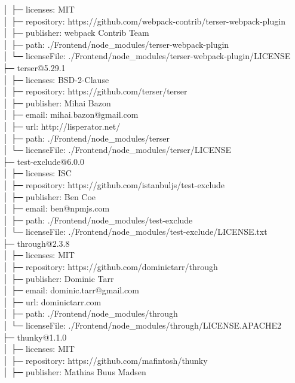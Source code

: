 │  ├─ licenses: MIT\\
│  ├─ repository: https://github.com/webpack-contrib/terser-webpack-plugin\\
│  ├─ publisher: webpack Contrib Team\\
│  ├─ path: ./Frontend/node\_modules/terser-webpack-plugin\\
│  └─ licenseFile: ./Frontend/node\_modules/terser-webpack-plugin/LICENSE\\
├─ terser@5.29.1\\
│  ├─ licenses: BSD-2-Clause\\
│  ├─ repository: https://github.com/terser/terser\\
│  ├─ publisher: Mihai Bazon\\
│  ├─ email: mihai.bazon@gmail.com\\
│  ├─ url: http://lisperator.net/\\
│  ├─ path: ./Frontend/node\_modules/terser\\
│  └─ licenseFile: ./Frontend/node\_modules/terser/LICENSE\\
├─ test-exclude@6.0.0\\
│  ├─ licenses: ISC\\
│  ├─ repository: https://github.com/istanbuljs/test-exclude\\
│  ├─ publisher: Ben Coe\\
│  ├─ email: ben@npmjs.com\\
│  ├─ path: ./Frontend/node\_modules/test-exclude\\
│  └─ licenseFile: ./Frontend/node\_modules/test-exclude/LICENSE.txt\\
├─ through@2.3.8\\
│  ├─ licenses: MIT\\
│  ├─ repository: https://github.com/dominictarr/through\\
│  ├─ publisher: Dominic Tarr\\
│  ├─ email: dominic.tarr@gmail.com\\
│  ├─ url: dominictarr.com\\
│  ├─ path: ./Frontend/node\_modules/through\\
│  └─ licenseFile: ./Frontend/node\_modules/through/LICENSE.APACHE2\\
├─ thunky@1.1.0\\
│  ├─ licenses: MIT\\
│  ├─ repository: https://github.com/mafintosh/thunky\\
│  ├─ publisher: Mathias Buus Madsen\\
